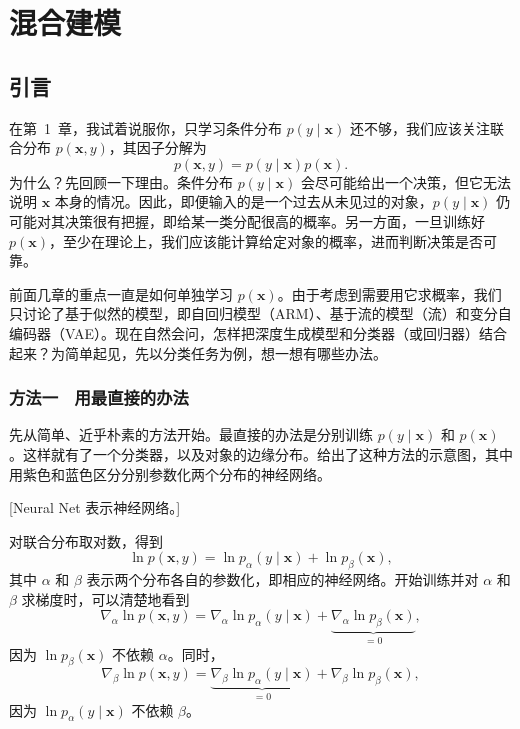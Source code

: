 \chapter{混合建模}
\section{引言}

在第~1~章，我试着说服你，只学习条件分布 $p(y\mid\mathbf{x})$ 还不够，我们应该关注联合分布 $p(\mathbf{x},y)$，其因子分解为
\begin{equation}
p(\mathbf{x},y)=p(y\mid\mathbf{x})p(\mathbf{x}).
\tag{6.1}\label{eq:06-01}
\end{equation}
为什么？先回顾一下理由。条件分布 $p(y\mid\mathbf{x})$ 会尽可能给出一个决策，但它无法说明 $\mathbf{x}$ 本身的情况。因此，即便输入的是一个过去从未见过的对象，$p(y\mid\mathbf{x})$ 仍可能对其决策很有把握，即给某一类分配很高的概率。另一方面，一旦训练好 $p(\mathbf{x})$，至少在理论上，我们应该能计算给定对象的概率，进而判断决策是否可靠。

前面几章的重点一直是如何单独学习 $p(\mathbf{x})$。由于考虑到需要用它求概率，我们只讨论了基于似然的模型，即自回归模型（ARM）、基于流的模型（流）和变分自编码器（VAE）。现在自然会问，怎样把深度生成模型和分类器（或回归器）结合起来？为简单起见，先以分类任务为例，想一想有哪些办法。

\subsection{方法一　用最直接的办法}

先从简单、近乎朴素的方法开始。最直接的办法是分别训练 $p(y\mid\mathbf{x})$ 和 $p(\mathbf{x})$。这样就有了一个分类器，以及对象的边缘分布。给出了这种方法的示意图，其中用紫色和蓝色区分分别参数化两个分布的神经网络。

[Neural Net 表示神经网络。]

对联合分布取对数，得到
\begin{equation}
\ln p(\mathbf{x},y)=\ln p_\alpha(y\mid\mathbf{x})+\ln p_\beta(\mathbf{x}),
\tag{6.2}\label{eq:06-02}
\end{equation}
其中 $\alpha$ 和 $\beta$ 表示两个分布各自的参数化，即相应的神经网络。开始训练并对 $\alpha$ 和 $\beta$ 求梯度时，可以清楚地看到
\begin{equation}
\nabla_\alpha\ln p(\mathbf{x},y)=\nabla_\alpha\ln p_\alpha(y\mid\mathbf{x})
+\underbrace{\nabla_\alpha\ln p_\beta(\mathbf{x})}_{=0},
\tag{6.3}\label{eq:06-03}
\end{equation}
因为 $\ln p_\beta(\mathbf{x})$ 不依赖 $\alpha$。同时，
\begin{equation}
\nabla_\beta\ln p(\mathbf{x},y)=\underbrace{\nabla_\beta\ln p_\alpha(y\mid\mathbf{x})}_{=0}
+\nabla_\beta\ln p_\beta(\mathbf{x}),
\tag{6.4}\label{eq:06-04}
\end{equation}
因为 $\ln p_\alpha(y\mid\mathbf{x})$ 不依赖 $\beta$。

